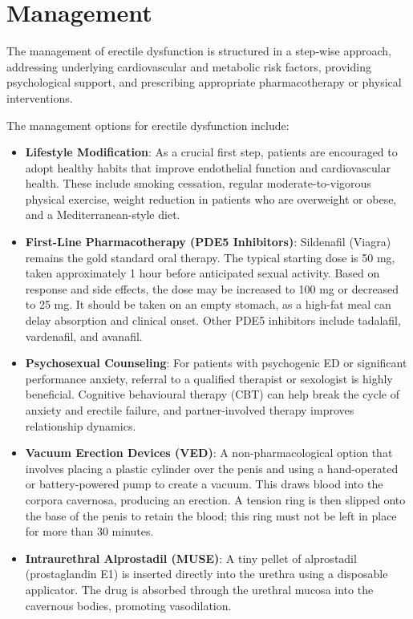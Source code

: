 \section*{Management}
The management of erectile dysfunction is structured in a step-wise approach, addressing underlying cardiovascular and metabolic risk factors, providing psychological support, and prescribing appropriate pharmacotherapy or physical interventions.

The management options for erectile dysfunction include:
\begin{itemize}
    \item \textbf{Lifestyle Modification}: As a crucial first step, patients are encouraged to adopt healthy habits that improve endothelial function and cardiovascular health. These include smoking cessation, regular moderate-to-vigorous physical exercise, weight reduction in patients who are overweight or obese, and a Mediterranean-style diet.
    \item \textbf{First-Line Pharmacotherapy (PDE5 Inhibitors)}: Sildenafil (Viagra) remains the gold standard oral therapy. The typical starting dose is 50 mg, taken approximately 1 hour before anticipated sexual activity. Based on response and side effects, the dose may be increased to 100 mg or decreased to 25 mg. It should be taken on an empty stomach, as a high-fat meal can delay absorption and clinical onset. Other PDE5 inhibitors include tadalafil, vardenafil, and avanafil.
    \item \textbf{Psychosexual Counseling}: For patients with psychogenic ED or significant performance anxiety, referral to a qualified therapist or sexologist is highly beneficial. Cognitive behavioural therapy (CBT) can help break the cycle of anxiety and erectile failure, and partner-involved therapy improves relationship dynamics.
    \item \textbf{Vacuum Erection Devices (VED)}: A non-pharmacological option that involves placing a plastic cylinder over the penis and using a hand-operated or battery-powered pump to create a vacuum. This draws blood into the corpora cavernosa, producing an erection. A tension ring is then slipped onto the base of the penis to retain the blood; this ring must not be left in place for more than 30 minutes.
    \item \textbf{Intraurethral Alprostadil (MUSE)}: A tiny pellet of alprostadil (prostaglandin E1) is inserted directly into the urethra using a disposable applicator. The drug is absorbed through the urethral mucosa into the cavernous bodies, promoting vasodilation.

\end{itemize}

